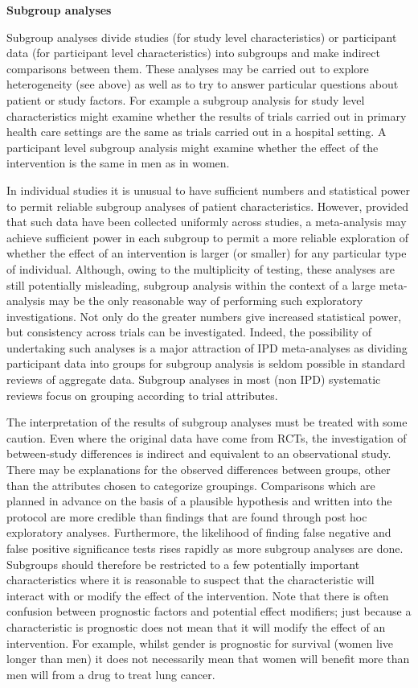 \documentclass[
  10pt,
  a4paper,
  DIV=11,
  numbers=noendperiod]{scrreprt}
\begin{document}
\textbf{Subgroup analyses}

Subgroup analyses divide studies (for study level characteristics) or
participant data (for participant level characteristics) into subgroups
and make indirect comparisons between them. These analyses may be
carried out to explore heterogeneity (see above) as well as to try to
answer particular questions about patient or study factors. For example
a subgroup analysis for study level characteristics might examine
whether the results of trials carried out in primary health care
settings are the same as trials carried out in a hospital setting. A
participant level subgroup analysis might examine whether the effect of
the intervention is the same in men as in women.

In individual studies it is unusual to have sufficient numbers and
statistical power to permit reliable subgroup analyses of patient
characteristics. However, provided that such data have been collected
uniformly across studies, a meta-analysis may achieve sufficient power
in each subgroup to permit a more reliable exploration of whether the
effect of an intervention is larger (or smaller) for any particular type
of individual. Although, owing to the multiplicity of testing, these
analyses are still potentially misleading, subgroup analysis within the
context of a large meta-analysis may be the only reasonable way of
performing such exploratory investigations. Not only do the greater
numbers give increased statistical power, but consistency across trials
can be investigated. Indeed, the possibility of undertaking such
analyses is a major attraction of IPD meta-analyses as dividing
participant data into groups for subgroup analysis is seldom possible in
standard reviews of aggregate data. Subgroup analyses in most (non IPD)
systematic reviews focus on grouping according to trial attributes.

The interpretation of the results of subgroup analyses must be treated
with some caution. Even where the original data have come from RCTs, the
investigation of between-study differences is indirect and equivalent to
an observational study. There may be explanations for the observed
differences between groups, other than the attributes chosen to
categorize groupings. Comparisons which are planned in advance on the
basis of a plausible hypothesis and written into the protocol are more
credible than findings that are found through post hoc exploratory
analyses. Furthermore, the likelihood of finding false negative and
false positive significance tests rises rapidly as more subgroup
analyses are done. Subgroups should therefore be restricted to a few
potentially important characteristics where it is reasonable to suspect
that the characteristic will interact with or modify the effect of the
intervention. Note that there is often confusion between prognostic
factors and potential effect modifiers; just because a characteristic is
prognostic does not mean that it will modify the effect of an
intervention. For example, whilst gender is prognostic for survival
(women live longer than men) it does not necessarily mean that women
will benefit more than men will from a drug to treat lung cancer.
\end{document}
